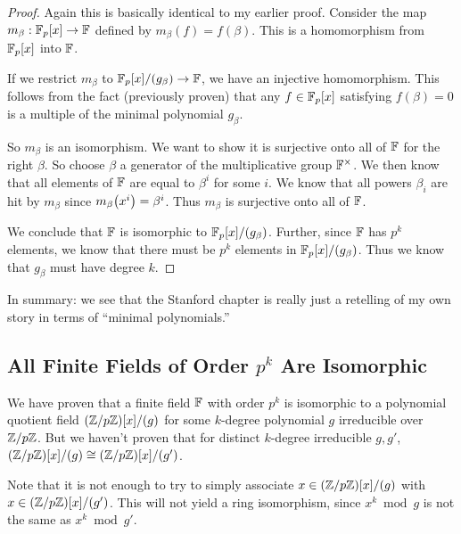 \begin{proof}
  Again this is basically identical to my earlier proof. Consider the
  map $m_\beta: \mathbb{F}_p[x] \to \mathbb{F}$ defined by $m_\beta(f) = f(\beta)$. This
  is a homomorphism from $\mathbb{F}_p[x]$ into $\mathbb{F}$.

  If we restrict $m_\beta$ to $\mathbb{F}_p[x]/(g_\beta) \to \mathbb{F}$, we have an
  injective homomorphism. This follows from the fact (previously proven)
  that any $f \in \mathbb{F}_p[x]$ satisfying $f(\beta) = 0$ is a multiple of the
  minimal polynomial $g_\beta$.

  So $m_\beta$ is an isomorphism. We want to show it is surjective onto
  all of $\mathbb{F}$ for the right $\beta$. So choose $\beta$ a generator of
  the multiplicative group $\mathbb{F}^\times$. We then know that all elements
  of $\mathbb{F}$ are equal to $\beta^i$ for some $i$. We know that all powers
  $\beta_i$ are hit by $m_\beta$ since $m_\beta\mathopen{}\left( {x^i} \right)\mathclose{} = \beta^i$.
  Thus $m_\beta$ is surjective onto all of $\mathbb{F}$.

  We conclude that $\mathbb{F}$ is isomorphic to $\mathbb{F}_p[x]/(g_\beta)$. Further,
  since $\mathbb{F}$ has $p^k$ elements, we know that there must be $p^k$
  elements in $\mathbb{F}_p[x]/(g_\beta)$. Thus we know that $g_\beta$ must have
  degree $k$.
\end{proof}

\begin{remark}
  In summary: we see that the Stanford chapter is really just a
  retelling of my own story in terms of ``minimal polynomials.''
\end{remark}

\subsection{All Finite Fields of Order $p^k$ Are Isomorphic}

\begin{remark}
  We have proven that a finite field $\mathbb{F}$ with order $p^k$ is isomorphic
  to a polynomial quotient field $\mathopen{}\left( {\mathbb{Z} / p\mathbb{Z}} \right)\mathclose{}[x]/(g)$ for some
  $k$-degree polynomial $g$ irreducible over $\mathbb{Z} / p\mathbb{Z}$. But we haven't
  proven that for distinct $k$-degree irreducible $g, g'$,
  $\mathopen{}\left( {\mathbb{Z} / p\mathbb{Z}} \right)\mathclose{}[x]/(g) \cong \mathopen{}\left( {\mathbb{Z} / p\mathbb{Z}} \right)\mathclose{}[x]/(g')$.

  Note that it is not enough to try to simply associate $x \in
  \mathopen{}\left( {\mathbb{Z} / p\mathbb{Z}} \right)\mathclose{}[x]/(g)$ with $x \in \mathopen{}\left( {\mathbb{Z} / p\mathbb{Z}} \right)\mathclose{}[x]/(g')$. This
  will not yield a ring isomorphism, since $x^k \bmod g$ is not the same
  as $x^k \bmod g'$.
\end{remark}

